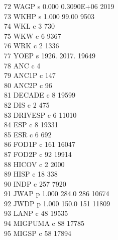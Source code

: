 \documentclass[12pt]{article}
\begin{document}
      72  WAGP       s    0.000       0.3090E+06               2019\\
      73  WKHP       s    1.000        99.00                   9503\\
      74  WKL        c                                  3       730\\
      75  WKW        c                                  6      9367\\
      76  WRK        c                                  2      1336\\
      77  YOEP       s    1926.        2017.                  19649\\
      78  ANC        c                                  4\\
      79  ANC1P      c                                147\\
      80  ANC2P      c                                 96\\
      81  DECADE     c                                  8     19599\\
      82  DIS        c                                  2       475\\
      83  DRIVESP    c                                  6     11010\\
      84  ESP        c                                  8     19331\\
      85  ESR        c                                  6       692\\
      86  FOD1P      c                                161     16047\\
      87  FOD2P      c                                 92     19914\\
      88  HICOV      c                                  2      2000\\
      89  HISP       c                                 18       338\\
      90  INDP       c                                257      7920\\
      91  JWAP       p    1.000        284.0          286     10674\\
      92  JWDP       p    1.000        150.0          151     11809\\
      93  LANP       c                                 48     19535\\
      94  MIGPUMA    c                                 88     17785\\
      95  MIGSP      c                                 58     17894\\
\end{document}

